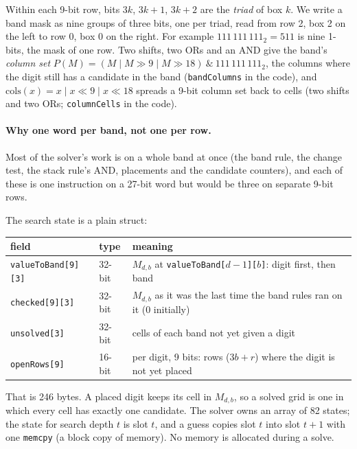 \documentclass[11pt]{article}
\theoremstyle{definition}
\theoremstyle{plain}
\begin{document}
\noindent Within each 9-bit row, bits $3k$, $3k{+}1$, $3k{+}2$ are the \emph{triad} of box $k$. We write a band mask as nine groups of three bits, one per triad,
read from row 2, box 2 on the left to row 0, box 0 on the right. For example $111\,111\,111_2 = 511$ is nine 1-bits,
the mask of one row. Two shifts, two ORs
and an AND give the band's \emph{column set} $P(M)=(M \mid M\gg 9 \mid M\gg 18)\ \&\ 111\,111\,111_2$, the columns where the digit still has a
candidate in the band (\texttt{bandColumns} in the code), and $\mathrm{cols}(x)=x \mid x\ll 9 \mid x\ll 18$ spreads a 9-bit column
set back to cells (two shifts and two ORs; \texttt{columnCells} in the code).

\paragraph{Why one word per band, not one per row.} Most of the solver's work is on a whole band at once (the band
rule, the change test, the stack rule's AND, placements and the candidate counters), and each of these is one
instruction on a 27-bit word but would be three on separate 9-bit rows.

The search state is a plain struct:

\begin{center}
\small
\begin{tabular}{lll}
\toprule
field & type & meaning \\
\midrule
\texttt{valueToBand[9][3]} & 32-bit & $M_{d,b}$ at \texttt{valueToBand[$d-1$][$b$]}: digit first, then band \\
\texttt{checked[9][3]} & 32-bit & $M_{d,b}$ as it was the last time the band rules ran on it (0 initially) \\
\texttt{unsolved[3]} & 32-bit & cells of each band not yet given a digit \\
\texttt{openRows[9]} & 16-bit & per digit, 9 bits: rows ($3b+r$) where the digit is not yet placed \\
\bottomrule
\end{tabular}
\end{center}

\noindent That is 246 bytes. A placed digit keeps its cell in $M_{d,b}$, so a solved grid is one in which every cell
has exactly one candidate. The solver owns an array of 82 states; the state for search depth $t$ is slot $t$, and a
guess copies slot $t$ into slot $t{+}1$ with one \texttt{memcpy} (a block copy of
memory). No memory is allocated during a solve.
\end{document}
